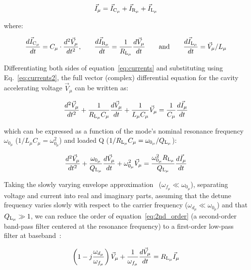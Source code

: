 \documentclass[a4paper,12pt]{article}
\begin{document}
\begin{equation}
  \centering \vec I_{\mu} = \vec I_{\rm C_{\mu}} + \vec I_{\rm R_{\mu}} + \vec I_{\rm L_{\mu}}
  \label{eq:currents}
\end{equation}

\noindent where:

\begin{equation}
  \frac{d\vec I_{\rm C_{\mu}}}{dt} = C_{\mu} \cdot \frac{d^2\vec V_{\mu}}{dt^2}\text{,}\qquad \frac{d\vec I_{\rm R_{\mu}}}{dt} = \frac{1}{R_{\rm L_{\mu}}}\frac{d\vec V_{\mu}}{dt} \qquad \text{and}\qquad \frac{d\vec I_{\rm L_{\mu}}}{dt} = \vec V_{\mu}/L_{\mu}
  \label{eq:currents2}
\end{equation}

Differentiating both sides of equation~\ref{eq:currents} and substituting using Eq.~\ref{eq:currents2}, the full vector (complex) differential equation for the cavity accelerating voltage $\vec V_{\mu}$ can be written as:

\begin{equation}
  \frac{d^2\vec V_{\mu}}{dt^2} + \frac{1}{R_{\rm L_{\mu}}C_{\mu}}\frac{d\vec V_{\mu}}{dt} + \frac{1}{L_{\mu}C_{\mu}}\vec V_{\mu} = \frac{1}{C_{\mu}}\frac{d\vec I_{\mu}}{dt}
\end{equation}

\noindent which can be expressed as a function of the mode's nominal resonance frequency $\omega_{0_{\mu}}$ ($1/L_{\mu}C_{\mu}=\omega_{0_{\mu}}^2$) and loaded Q ($1/R_{\rm L_{\mu}}C_{\mu}=\omega_{0_{\mu}}/Q_{\rm L_{\mu}}$):

\begin{equation}
  \frac{d^2\vec V_{\mu}}{dt^2} + \frac{\omega_{0_{\mu}}}{Q_{\rm L_{\mu}}}\frac{d\vec V_{\mu}}{dt} + \omega_{0_{\mu}}^2 \vec V_{\mu} = \frac{\omega_{0_{\mu}}^2 R_{\rm L_{\mu}}}{Q_{\rm L_{\mu}}}\frac{d\vec I_{\mu}}{dt}
  \label{eq:2nd_order}
\end{equation}

Taking the slowly varying envelope approximation~\cite{ref:svea} ($\omega_{f_{\mu}} \ll \omega_{0_{\mu}}$), separating voltage and current into real and imaginary parts, assuming that the detune frequency varies slowly with respect to the carrier frequency ($\omega_{d_{\mu}} \ll \omega_{0_{\mu}}$) and that $Q_{\rm L_{\mu}} \gg 1$, we can reduce the order of equation~\ref{eq:2nd_order} (a second-order band-pass filter centered at the resonance frequency) to a first-order low-pass filter at baseband~\cite{ref:schilcher}:

\begin{equation}
  \left(1-j\frac{\omega_{d_{\mu}}}{\omega_{f_{\mu}}}\right)\vec V_{\mu} + \frac{1}{\omega_{f_{\mu}}}\frac{d\vec V_{\mu}}{dt} = R_{\rm L_{\mu}} \vec I_{\mu}
  \label{eq:1st_order1}
\end{equation}
\end{document}
